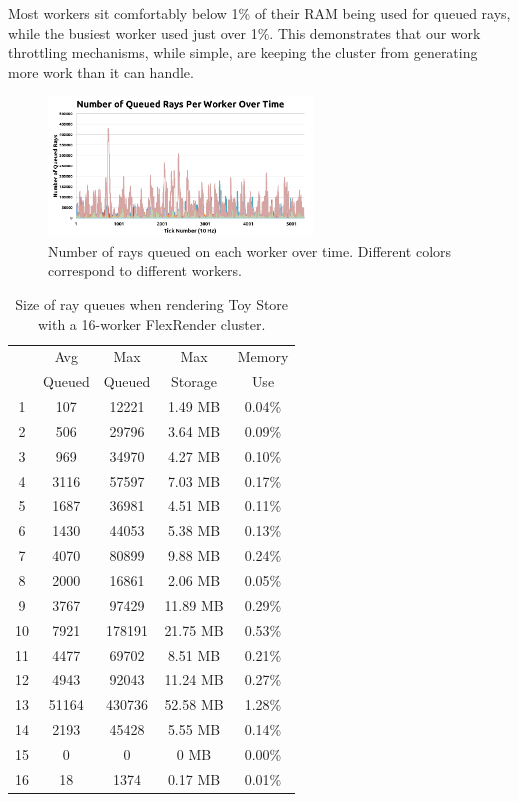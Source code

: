 \documentclass[a4paper,twoside]{article}
\begin{document}
Most workers sit comfortably below 1\% of their RAM being used for queued rays,
while the busiest worker used just over 1\%. This demonstrates that our work
throttling mechanisms, while simple, are keeping the cluster from generating
more work than it can handle.

\begin{figure}[h!]
    \centering
    \includegraphics[width=70mm]{figures/queuesize.png}
    \caption{Number of rays queued on each worker over time. Different colors correspond to different workers.}
    \label{fig:queuesize}
\end{figure}

\begin{table}
\begin{center}
\begin{tabular}{|c||c|c|c|c|}
    \hline
    & Avg  & Max & Max & Memory \\
    & Queued & Queued & Storage & Use \\
    \hline
    \hline
    1 & 107 & 12221 & 1.49 MB & 0.04\% \\
    \hline
    2 & 506 & 29796 & 3.64 MB & 0.09\% \\
    \hline
    3 & 969 & 34970 & 4.27 MB & 0.10\% \\
    \hline
    4 & 3116 & 57597 & 7.03 MB & 0.17\% \\
    \hline
    5 & 1687 & 36981 & 4.51 MB & 0.11\% \\
    \hline
    6 & 1430 & 44053 & 5.38 MB & 0.13\% \\
    \hline
    7 & 4070 & 80899 & 9.88 MB & 0.24\% \\
    \hline
    8 & 2000 & 16861 & 2.06 MB & 0.05\% \\
    \hline
    9 & 3767 & 97429 & 11.89 MB & 0.29\% \\
    \hline
    10 & 7921 & 178191 & 21.75 MB & 0.53\% \\
    \hline
    11 & 4477 & 69702 & 8.51 MB & 0.21\% \\
    \hline
    12 & 4943 & 92043 & 11.24 MB & 0.27\% \\
    \hline
    13 & 51164 & 430736 & 52.58 MB & 1.28\% \\
    \hline
    14 & 2193 & 45428 & 5.55 MB & 0.14\% \\
    \hline
    15 & 0 & 0 & 0 MB & 0.00\% \\
    \hline
    16 & 18 & 1374 & 0.17 MB & 0.01\% \\
    \hline
\end{tabular}
\caption{Size of ray queues when rendering Toy Store with a 16-worker FlexRender cluster.}
\label{tb:rayqueues}
\end{center}
\end{table}
\end{document}

